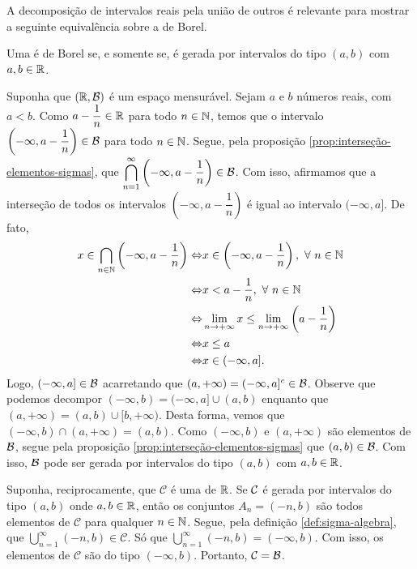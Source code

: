 A decomposição de intervalos reais pela união de outros é relevante para mostrar a seguinte equivalência sobre a \sigal de Borel.\\
\begin{theorem}
\label{teo:equiv-borel}
    Uma \sigal é de Borel  se, e somente se, é gerada por intervalos do tipo $(a,b)$ com $a,b \in \mathbb{R}$.
\end{theorem}

\begin{prova}
   Suponha que $(\mathbb{R},\operatorname{\mathcal{B}})$ é um espaço mensurável. 
   Sejam $a$ e $b$ números reais, com $a<b$.
   Como $a - \dfrac{1}{n} \in \mathbb{R}$ para todo $n \in \operatorname{\mathbb{N}}$, temos que o intervalo
   $\left(-\infty, a- \dfrac{1}{n}\right) \in \operatorname{\mathcal{B}}$ para todo $n \in \operatorname{\mathbb{N}}$.
   Segue, pela proposição \ref{prop:interseção-elementos-sigmas}, que
   $\displaystyle \bigcap_{n = 1}^\infty \left(-\infty, a- \dfrac{1}{n}\right) \in \operatorname{\mathcal{B}}$.
   Com isso, afirmamos que a interseção de todos os intervalos $\left(-\infty, a - \dfrac{1}{n}\right)$ é igual ao intervalo $(-\infty, a]$.
   De fato,
   \begin{align*}
   		x \in \bigcap_{n \in \operatorname{\mathbb{N}}} \left(-\infty, a - \dfrac{1}{n}\right)
   		\Leftrightarrow & x \in \left(-\infty, a - \dfrac{1}{n}\right), \ \forall \ n \in \operatorname{\mathbb{N}}\\
   		\Leftrightarrow & x < a - \dfrac{1}{n}, \ \forall \ n \in \operatorname{\mathbb{N}}\\
   		\Leftrightarrow & \displaystyle \lim_{n \to +\infty} x \leq \displaystyle \lim_{n \to +\infty} \left(a - \dfrac{1}{n}\right)\\
   		\Leftrightarrow & x \leq a\\
   		\Leftrightarrow & x \in (-\infty, a].
   \end{align*}
	Logo, $(-\infty, a] \in \operatorname{\mathcal{B}}$ acarretando que $(a, +\infty) = (-\infty, a]^c \in \operatorname{\mathcal{B}}$.
	Observe que podemos decompor $(-\infty, b) = (-\infty,a] \cup (a, b)$ enquanto que $(a, +\infty) = (a, b) \cup [b, +\infty)$.
	Desta forma, vemos que $(-\infty, b) \cap (a, +\infty) = (a,b)$. 
	Como $(-\infty, b)$ e $(a, +\infty)$ são elementos de $\operatorname{\mathcal{B}}$, segue pela proposição
	\ref{prop:interseção-elementos-sigmas} que $(a,b) \in \operatorname{\mathcal{B}}$.
	Com isso, $\operatorname{\mathcal{B}}$ pode ser gerada por intervalos do tipo $(a,b)$ com $a,b \in \mathbb{R}$.
   
	Suponha, reciprocamente, que $\mathcal{C}$ é uma \sigal de $\mathbb{R}$.
	Se $\operatorname{\mathcal{C}}$ é gerada por intervalos do tipo $(a,b)$ onde $a,b \in \mathbb{R}$, então
	os conjuntos $A_n = (-n, b)$ são todos elementos de $\mathcal{C}$ para qualquer $n \in \operatorname{\mathbb{N}}$.
	Segue, pela definição \ref{def:sigma-algebra}, que 
	$\displaystyle \bigcup_{n = 1}^\infty (-n,b) \in \mathcal{C}$.
	Só que $\displaystyle \bigcup_{n = 1}^\infty (-n,b) = (-\infty, b)$.
	Com isso, os elementos de $\mathcal{C}$ são do tipo $(-\infty, b)$.
	Portanto, $\mathcal{C} = \operatorname{\mathcal{B}}$.

\end{prova}

